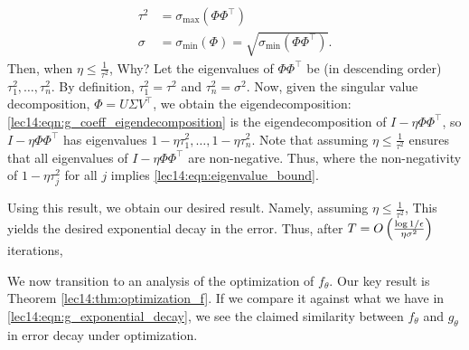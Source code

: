 \begin{align}
    \tau^2 &= \sigma_{\text{max}}(\Phi \Phi^\top) \\
    \sigma &= \sigma_\text{min}(\Phi) = \sqrt{\sigma_\text{min}(\Phi\Phi^\top)}. \label{lec14:eqn:sigma_def}
\end{align}
Then, when $\eta \leq \frac{1}{\tau^2}$,
Why? Let the eigenvalues of $\Phi \Phi^\top$ be (in descending order) $\tau_1^2, \dots , \tau_n^2$. By definition, $\tau_1^2 = \tau^2$ and $\tau_n^2 = \sigma^2$. Now, given the singular value decomposition, $\Phi = U\Sigma V^\top$, we obtain the eigendecomposition: 
\eqref{lec14:eqn:g_coeff_eigendecomposition} is the eigendecomposition of $I - \eta \Phi \Phi^\top$, so $I - \eta \Phi \Phi^\top$ has eigenvalues $1 - \eta \tau_1^2, \dots, 1 - \eta \tau_n^2$. Note that assuming $\eta \leq \frac{1}{\tau^2}$ ensures that all eigenvalues of $I - \eta \Phi \Phi^\top$ are non-negative. Thus,
where the non-negativity of $1 - \eta \tau_j^2$ for all $j$ implies \eqref{lec14:eqn:eigenvalue_bound}.

Using this result, we obtain our desired result. Namely, assuming $\eta \leq \frac{1}{\tau^2}$,
This yields the desired exponential decay in the error. Thus, after $T = O \left( \frac{\log 1/\epsilon}{\eta \sigma^2}\right)$ iterations, 

We now transition to an analysis of the optimization of $f_{\theta}$. Our key result is Theorem \ref{lec14:thm:optimization_f}. If we compare it against what we have in \eqref{lec14:eqn:g_exponential_decay}, we see the claimed similarity between $f_\theta$ and $g_\theta$ in error decay under optimization. 

